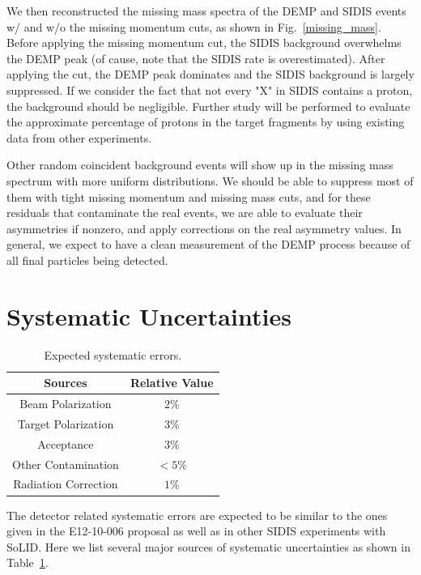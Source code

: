 We then reconstructed the missing mass spectra of the DEMP and SIDIS events w/ and w/o the missing momentum cuts, as shown in Fig.~\ref{missing_mass}. Before applying the missing momentum cut, the SIDIS background overwhelms the DEMP peak (of cause, note that the SIDIS rate is overestimated). After applying the cut, the DEMP peak dominates and the SIDIS background is largely suppressed. If we consider the fact that not every "X" in SIDIS contains a proton, the background should be negligible. Further study will be performed to evaluate the approximate percentage of protons in the target fragments by using existing data from other experiments.

Other random coincident background events will show up in the missing mass spectrum with more uniform distributions. We should be able to suppress most of them with tight missing momentum and missing mass cuts, and for these residuals that contaminate the real events, we are able to evaluate their asymmetries if nonzero, and apply corrections on the real asymmetry values. In general, we expect to have a clean measurement of the DEMP process because of all final particles being detected.

\section{Systematic Uncertainties}
\begin{table}[!htp]
\centering
\begin{tabular}{|c|c|}
\hline
{\bf Sources}                  & {\bf Relative Value} \\\hline
Beam Polarization         & $2\%$ \\\hline 
Target Polarization         & $3\%$ \\\hline 
Acceptance                    & $3\%$ \\\hline
Other Contamination      & $<5\%$ \\\hline
Radiation Correction      & $1\%$ \\\hline
\end{tabular}
\caption{\footnotesize{Expected systematic errors.}}\label{table:det_sys_err}
\end{table}
The detector related systematic errors are expected to be similar to the ones
given in the E12-10-006 proposal as well as in other SIDIS experiments with
SoLID. Here we list several major sources of systematic uncertainties as shown in Table~\ref{table:det_sys_err}.  

